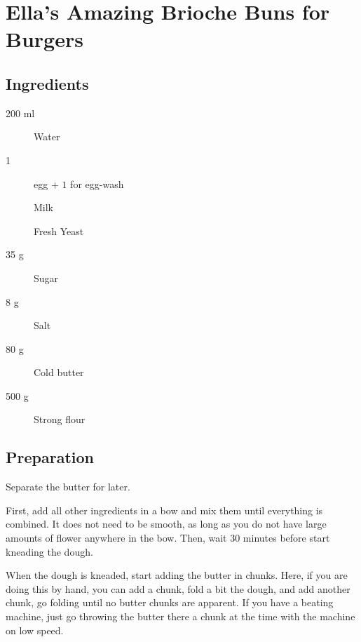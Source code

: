 \setchapterpreamble[u]{\margintoc}
\chapter{Ella's Amazing Brioche Buns for Burgers}\label{burger buns}

\section{Ingredients}

\begin{multicols}{2}
\begin{description}
	\item[200 ml] Water
	\item[1] egg + $1$ for egg-wash
	\item[] Milk
	\item[] Fresh Yeast
	\item[35 g] Sugar
	\item[8 g] Salt
	\item[80 g] Cold butter
	\item[500 g] Strong flour
\end{description}
\end{multicols}	

\section{Preparation}
Separate the butter for later.

First, add all other ingredients in a bow and mix them until everything is combined. It does not need to be smooth, as long as you do not have large amounts of flower anywhere in the bow.
%
Then, wait $30$ minutes before start kneading the dough.

When the dough is kneaded, start adding the butter in chunks.
%
Here, if you are doing this by hand, you can add a chunk, fold a bit the dough, and add another chunk, go folding until no butter chunks are apparent. 
%
If you have a beating machine, just go throwing the butter there a chunk at the time with the machine on low speed.

